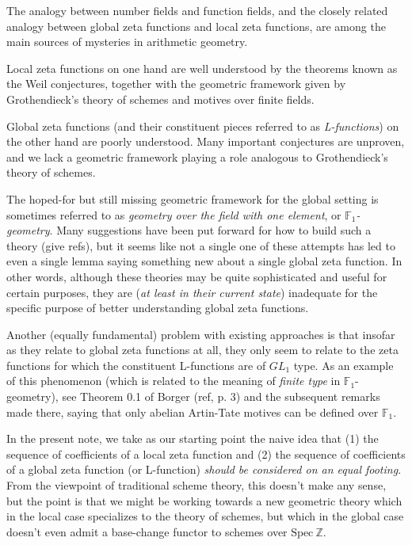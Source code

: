 \documentclass[paper=a4, fontsize=11pt]{scrartcl} %
\numberwithin{equation}{section} %
\numberwithin{figure}{section} %
\numberwithin{table}{section} %
\begin{document}
The analogy between number fields and function fields, and the closely related analogy between global zeta functions and local zeta functions, are among the main sources of mysteries in arithmetic geometry.

Local zeta functions on one hand are well understood by the theorems known as the Weil conjectures, together with the geometric framework given by Grothendieck's theory of schemes and motives over finite fields.

Global zeta functions (and their constituent pieces referred to as \emph{L-functions}) on the other hand are poorly understood. Many important conjectures are unproven, and we lack a geometric framework playing a role analogous to Grothendieck's theory of schemes.

The hoped-for but still missing geometric framework for the global setting is sometimes referred to as \emph{geometry over the field with one element}, or \emph{$\mathbb{F}_1$-geometry}. Many suggestions have been put forward for how to build such a theory (give refs), but it seems like not a single one of these attempts has led to even a single lemma saying something new about a single global zeta function. In other words, although these theories may be quite sophisticated and useful for certain purposes, they are (\emph{at least in their current state}) inadequate for the specific purpose of better understanding global zeta functions.

Another (equally fundamental) problem with existing approaches is that insofar as they relate to global zeta functions at all, they only seem to relate to the zeta functions for which the constituent L-functions are of $GL_1$ type. As an example of this phenomenon (which is related to the meaning of \emph{finite type} in $\mathbb{F}_1$-geometry), see Theorem 0.1 of Borger (ref, p. 3) and the subsequent remarks made there, saying that only abelian Artin-Tate motives can be defined over $\mathbb{F}_1$. %

In the present note, we take as our starting point the naive idea that (1) the sequence of coefficients of a local zeta function and (2) the sequence of coefficients of a global zeta function (or L-function) \emph{should be considered on an equal footing}. From the viewpoint of traditional scheme theory, this doesn't make any sense, but the point is that we might be working towards a new geometric theory which in the local case specializes to the theory of schemes, but which in the global case doesn't even admit a base-change functor to schemes over $\mathrm{Spec} \ \mathbb{Z}$.
\end{document}
